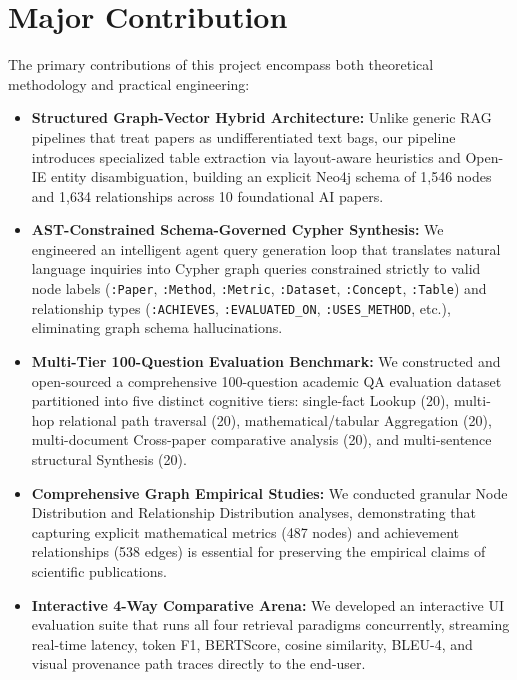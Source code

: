 \documentclass[12pt,a4paper,oneside]{report}
\begin{document}
\section{Major Contribution}
\label{sec:major_contribution}
The primary contributions of this project encompass both theoretical methodology and practical engineering:
\begin{itemize}
    \item \textbf{Structured Graph-Vector Hybrid Architecture:} Unlike generic RAG pipelines that treat papers as undifferentiated text bags, our pipeline introduces specialized table extraction via layout-aware heuristics and Open-IE entity disambiguation, building an explicit Neo4j schema of 1,546 nodes and 1,634 relationships across 10 foundational AI papers.
    \item \textbf{AST-Constrained Schema-Governed Cypher Synthesis:} We engineered an intelligent agent query generation loop that translates natural language inquiries into Cypher graph queries constrained strictly to valid node labels (\texttt{:Paper}, \texttt{:Method}, \texttt{:Metric}, \texttt{:Dataset}, \texttt{:Concept}, \texttt{:Table}) and relationship types (\texttt{:ACHIEVES}, \texttt{:EVALUATED\_ON}, \texttt{:USES\_METHOD}, etc.), eliminating graph schema hallucinations.
    \item \textbf{Multi-Tier 100-Question Evaluation Benchmark:} We constructed and open-sourced a comprehensive 100-question academic QA evaluation dataset partitioned into five distinct cognitive tiers: single-fact Lookup (20), multi-hop relational path traversal (20), mathematical/tabular Aggregation (20), multi-document Cross-paper comparative analysis (20), and multi-sentence structural Synthesis (20).
    \item \textbf{Comprehensive Graph Empirical Studies:} We conducted granular Node Distribution and Relationship Distribution analyses, demonstrating that capturing explicit mathematical metrics (487 nodes) and achievement relationships (538 edges) is essential for preserving the empirical claims of scientific publications.
    \item \textbf{Interactive 4-Way Comparative Arena:} We developed an interactive UI evaluation suite that runs all four retrieval paradigms concurrently, streaming real-time latency, token F1, BERTScore, cosine similarity, BLEU-4, and visual provenance path traces directly to the end-user.
\end{itemize}
\end{document}
